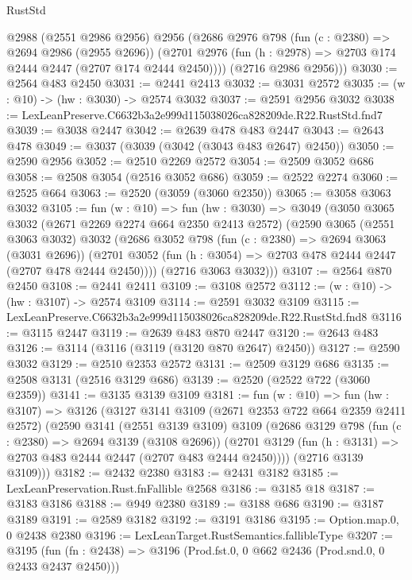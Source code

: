 \begin{lexlean}{RustStd}
\begin{coremodule}
        @2988
        (@2551 @2986 @2956)
        @2956
        (@2686
          @2976
          @798
          (fun (c : @2380) => @2694 @2986 (@2955 @2696))
          (@2701 @2976 (fun (h : @2978) => @2703 @174 @2444 @2447 (@2707 @174 @2444 @2450))))
        (@2716 @2986 @2956)))
@3030 := @2564 @483 @2450
@3031 := @2441 @2413
@3032 := @3031 @2572
@3035 := (w : @10) -> (hw : @3030) -> @2574 @3032
@3037 := @2591 @2956 @3032
@3038 := LexLeanPreserve.C6632b3a2e999d115038026ca828209de.R22.RustStd.fnd7
@3039 := @3038 @2447
@3042 := @2639 @478 @483 @2447
@3043 := @2643 @478
@3049 := @3037 (@3039 (@3042 (@3043 @483 @2647) @2450))
@3050 := @2590 @2956
@3052 := @2510 @2269 @2572
@3054 := @2509 @3052 @686
@3058 := @2508 @3054 (@2516 @3052 @686)
@3059 := @2522 @2274
@3060 := @2525 @664
@3063 := @2520 (@3059 (@3060 @2350))
@3065 := @3058 @3063 @3032
@3105 := fun (w : @10) =>
  fun (hw : @3030) =>
  @3049
    (@3050
      @3065
      @3032
      (@2671 @2269 @2274 @664 @2350 @2413 @2572)
      (@2590
        @3065
        (@2551 @3063 @3032)
        @3032
        (@2686
          @3052
          @798
          (fun (c : @2380) => @2694 @3063 (@3031 @2696))
          (@2701 @3052 (fun (h : @3054) => @2703 @478 @2444 @2447 (@2707 @478 @2444 @2450))))
        (@2716 @3063 @3032)))
@3107 := @2564 @870 @2450
@3108 := @2441 @2411
@3109 := @3108 @2572
@3112 := (w : @10) -> (hw : @3107) -> @2574 @3109
@3114 := @2591 @3032 @3109
@3115 := LexLeanPreserve.C6632b3a2e999d115038026ca828209de.R22.RustStd.fnd8
@3116 := @3115 @2447
@3119 := @2639 @483 @870 @2447
@3120 := @2643 @483
@3126 := @3114 (@3116 (@3119 (@3120 @870 @2647) @2450))
@3127 := @2590 @3032
@3129 := @2510 @2353 @2572
@3131 := @2509 @3129 @686
@3135 := @2508 @3131 (@2516 @3129 @686)
@3139 := @2520 (@2522 @722 (@3060 @2359))
@3141 := @3135 @3139 @3109
@3181 := fun (w : @10) =>
  fun (hw : @3107) =>
  @3126
    (@3127
      @3141
      @3109
      (@2671 @2353 @722 @664 @2359 @2411 @2572)
      (@2590
        @3141
        (@2551 @3139 @3109)
        @3109
        (@2686
          @3129
          @798
          (fun (c : @2380) => @2694 @3139 (@3108 @2696))
          (@2701 @3129 (fun (h : @3131) => @2703 @483 @2444 @2447 (@2707 @483 @2444 @2450))))
        (@2716 @3139 @3109)))
@3182 := @2432 @2380
@3183 := @2431 @3182
@3185 := LexLeanPreservation.Rust.fnFallible @2568
@3186 := @3185 @18
@3187 := @3183 @3186
@3188 := @949 @2380
@3189 := @3188 @686
@3190 := @3187 @3189
@3191 := @2589 @3182
@3192 := @3191 @3186
@3195 := Option.map.{0, 0} @2438 @2380
@3196 := LexLeanTarget.RustSemantics.fallibleType
@3207 := @3195
    (fun (fn : @2438) => @3196 (Prod.fst.{0, 0} @662 @2436 (Prod.snd.{0, 0} @2433 @2437 @2450)))

\end{coremodule}
\end{lexlean}
